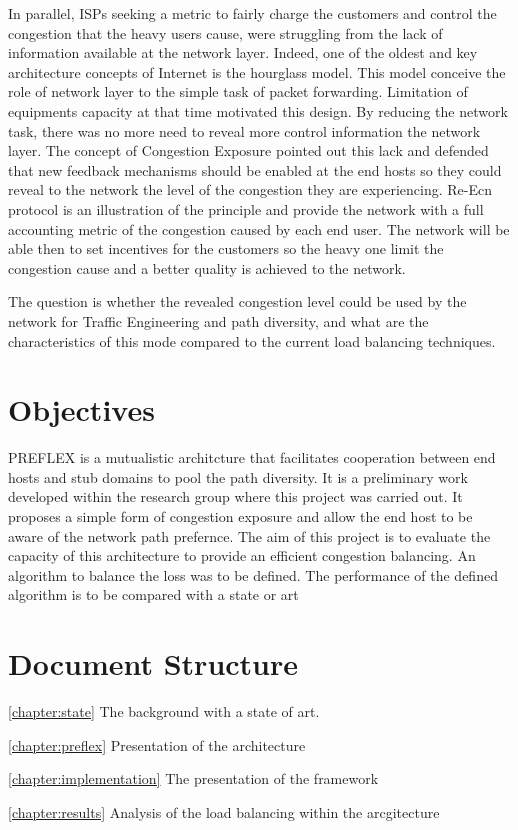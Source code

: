 In parallel, ISPs seeking a metric to fairly charge the customers and control the congestion that the heavy users cause, were struggling from the lack of information available at the network layer. Indeed, one of the oldest and key architecture concepts of Internet is the hourglass model. This model conceive the role of  network layer to the simple task of packet forwarding. Limitation of  equipments capacity at that time motivated this design. By reducing the network task, there was no more need to reveal more control information the network layer. The concept of Congestion Exposure pointed out this lack and defended that new feedback mechanisms should be enabled at the end hosts so they could reveal to the network the level of the congestion they are experiencing. Re-Ecn protocol is an illustration of the principle and provide the network with a full accounting metric of the congestion caused by each end user. The network will be able then to set incentives for the customers so the heavy one limit the congestion cause and a better quality is achieved to the network.

The question is whether the revealed congestion level could be used by the network for Traffic Engineering and path diversity, and what are the characteristics of this mode compared to the current load balancing techniques.

\section{Objectives}
PREFLEX is a mutualistic architcture that facilitates cooperation between end hosts and stub domains to pool the path diversity. It is a preliminary work developed within the research group where this project was carried out.
It proposes a simple form of congestion exposure and allow the end host to be aware of the network path prefernce. The aim of this project is to evaluate the capacity of this architecture to provide an efficient congestion balancing. An algorithm to balance the loss was to be defined.
The performance of the defined algorithm is to be compared with a state or art 

\section{Document Structure}

\ref{chapter:state}
The background with a state of art.

\ref{chapter:preflex}
Presentation of the architecture

\ref{chapter:implementation}
The presentation of the framework

\ref{chapter:results}
Analysis of the load balancing within the arcgitecture